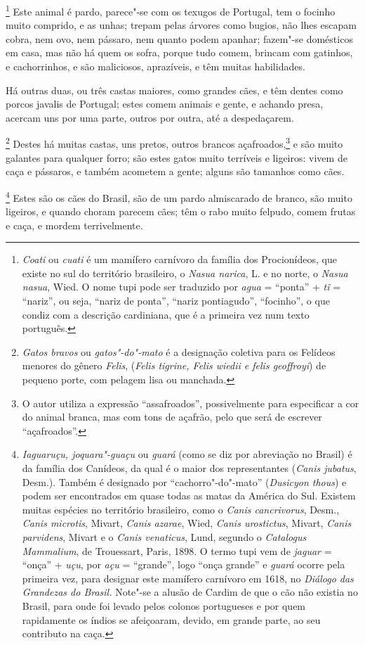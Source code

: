 \begin{linenumbers}
\footnote{ \textit{Coati} ou \textit{cuati} é
um mamífero carnívoro da família dos Procionídeos, que existe no sul do
território brasileiro, o \textit{Nasua narica}, L. e no norte, o
\textit{Nasua nasua}, Wied. O nome tupi pode ser traduzido por
\textit{agua} = ``ponta'' + \textit{tî} = ``nariz'', ou seja, ``nariz de
ponta'', ``nariz pontiagudo'', ``focinho'', o que condiz com a descrição
cardiniana, que é a primeira vez num texto português.} Este animal
é pardo, parece"-se com os texugos de Portugal, tem o focinho muito
comprido, e as unhas; trepam pelas árvores como bugios, não lhes
escapam cobra, nem ovo, nem pássaro, nem quanto podem apanhar; fazem"-se
domésticos em casa, mas não há quem os sofra, porque tudo comem, brincam
com gatinhos, e cachorrinhos, e são maliciosos, aprazíveis, e têm
muitas habilidades.

 Há outras duas, ou três castas maiores, como grandes cães, e têm dentes
como porcos javalis de Portugal; estes comem animais e gente, e achando
presa, acercam uns por uma parte, outros por outra, até a despedaçarem.

\footnote{ \textit{Gatos bravos} ou
\textit{gatos"-do"-mato} é a designação coletiva para os Felídeos
menores do gênero \textit{Felis}, (\textit{Felis tigrine, Felis wiedii e felis
geoffroyi}) de pequeno porte, com pelagem lisa ou manchada.} 
Destes há muitas castas, uns pretos, outros brancos açafroados,\footnote{ O autor utiliza a expressão ``assafroados'', 
possivelmente para especificar a cor do animal branca, mas com tons de
açafrão, pelo que será de escrever ``açafroados''.} e são muito
galantes para qualquer forro; são estes gatos muito terríveis e
ligeiros: vivem de caça e pássaros, e também acometem a gente; alguns
são tamanhos como cães. 

\footnote{ \textit{Iaguaruçu, joquara"-guaçu} ou 
\textit{guará} (como se diz por abreviação no Brasil) é da
família dos Canídeos, da qual é o maior dos representantes (\textit{Canis jubatus}, Desm.). Também é designado por
``cachorro"-do"-mato'' (\textit{Dusicyon thous}) e podem ser encontrados
em quase todas as matas da América do Sul. Existem muitas espécies no
território brasileiro, como o \textit{Canis cancrivorus}, Desm.,
\textit{Canis microtis}, Mivart, \textit{Canis azarae}, Wied,
\textit{Canis urostictus}, Mivart, \textit{Canis parvidens}, Mivart e o
\textit{Canis venaticus}, Lund, segundo o \textit{Catalogus Mammalium}, de Trouessart, Paris, 1898. O termo tupi vem de \textit{jaguar} = 
``onça'' + \textit{uçu}, por \textit{açu} = ``grande'', logo ``onça grande'' 
e \textit{guará} ocorre pela primeira vez, para designar
este mamífero carnívoro em 1618, no \textit{Diálogo das Grandezas do
Brasil.} Note"-se a alusão de Cardim de que o cão não existia no Brasil,
para onde foi levado pelos colonos portugueses e por quem rapidamente
os índios se afeiçoaram, devido, em grande parte, ao seu contributo na
caça.} Estes são os cães do Brasil, são de um pardo
almiscarado de branco, são muito ligeiros, e quando choram parecem cães;
têm o rabo muito felpudo, comem frutas e caça, e mordem terrivelmente.


\end{linenumbers}

